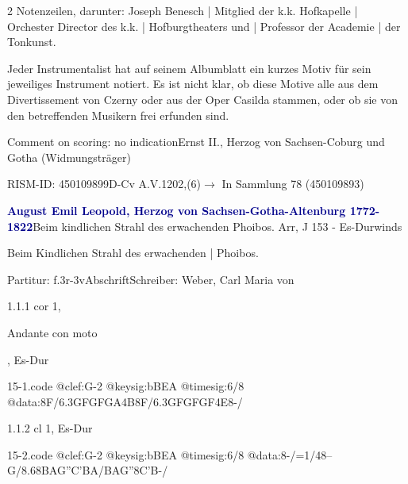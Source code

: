 \documentclass[a4paper, twocolumn, 11pt]{book}
\begin{document}
\newline %
\par 2 Notenzeilen, darunter: Joseph Benesch | Mitglied der k.k. Hofkapelle | Orchester Director des k.k. | Hofburgtheaters und | Professor der Academie | der Tonkunst.
\par Jeder Instrumentalist hat auf seinem Albumblatt ein kurzes Motiv für sein jeweiliges Instrument notiert. Es ist nicht klar, ob diese Motive alle aus dem {\textquotedbl}Divertissement{\textquotedbl} von Czerny oder aus der Oper {\textquotedbl}Casilda{\textquotedbl} stammen, oder ob sie von den betreffenden Musikern frei erfunden sind.
\par Comment on scoring: no indication\newline Ernst II., Herzog von Sachsen-Coburg und Gotha  (Widmungsträger)
\par RISM-ID: 450109899\newline D-Cv  A.V.1202,(6)\newline $\rightarrow$ In Sammlung 78 (450109893)
      
\par \vspace{16pt} \textcolor{darkblue}{\textbf{August Emil Leopold, Herzog von Sachsen-Gotha-Altenburg  1772-1822}}\hfillplus{[15]}\newline Beim kindlichen Strahl des erwachenden Phoibos. Arr, J 153 - Es-Dur\newline winds
\par \begin{itshape} Beim Kindlichen Strahl des erwachenden | Phoibos.\end{itshape} 
\par \textcolor{darkblue}{}  Partitur: f.3r-3v\newline Abschrift\newline Schreiber: Weber, Carl Maria von
\par 1.1.1  cor 1, \begin{itshape}Andante con moto\end{itshape}, Es-Dur  
\begin{filecontents*}{15-1.code}
@clef:G-2
@keysig:bBEA
@timesig:6/8
@data:8F/6.3{GFGFGA}4B8F/{6.3GFGFGF}4E8-/
\end{filecontents*}

\newline %
\par 1.1.2  cl 1, Es-Dur  
\begin{filecontents*}{15-2.code}
@clef:G-2
@keysig:bBEA
@timesig:6/8
@data:8-/=1/48--G/8.68{BAG}{''C'BA}/{BAG}''{8C'B}-/
\end{filecontents*}
\end{document}
